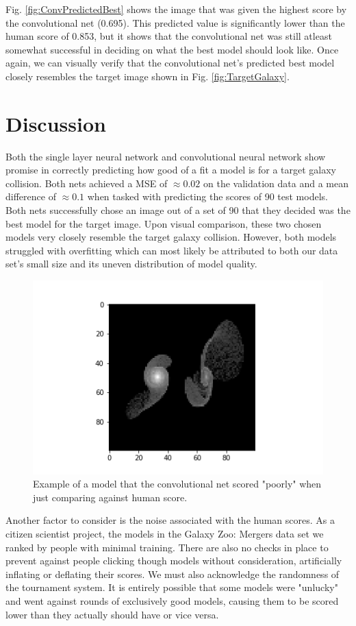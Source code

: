 \documentclass[conference]{IEEEtran}
\begin{document}
Fig. \ref{fig:ConvPredictedBest} shows the image that was given the highest score by the convolutional net (0.695). This predicted value is significantly lower than the human score of 0.853, but it shows that the  convolutional net was still atleast somewhat successful in deciding on what the best model should look like. Once again, we can visually verify that the convolutional net's predicted best model closely resembles the target image shown in Fig. \ref{fig:TargetGalaxy}.

\section{Discussion}

Both the single layer neural network and convolutional neural network show promise in correctly predicting how good of a fit a model is for a target galaxy collision. Both nets achieved a MSE of $\approx 0.02$ on the validation data and a mean difference of $\approx 0.1$ when tasked with predicting the scores of 90 test models. Both nets successfully chose an image out of a set of 90 that they decided was the best model for the target image. Upon visual comparison, these two chosen models very closely resemble the target galaxy collision. However, both models struggled with overfitting which can most likely be attributed to both our data set's small size and its uneven distribution of model quality. 

\begin{figure}[htbp]
\centerline{\includegraphics[width=0.75\linewidth]{./Images/ConvHumanNoiseExample.png}}
\caption{Example of a model that the convolutional net scored "poorly" when just comparing against human score.}
\label{fig:ConvHumanNoiseExample}
\end{figure}

Another factor to consider is the noise associated with the human scores. As a citizen scientist project, the models in the Galaxy Zoo: Mergers data set we ranked by people with minimal training. There are also no checks in place to prevent against people clicking though models without consideration, artificially inflating or deflating their scores. We must also acknowledge the randomness of the tournament system. It is entirely possible that some models were "unlucky" and went against rounds of exclusively good models, causing them to be scored lower than they actually should have or vice versa.
\end{document}
